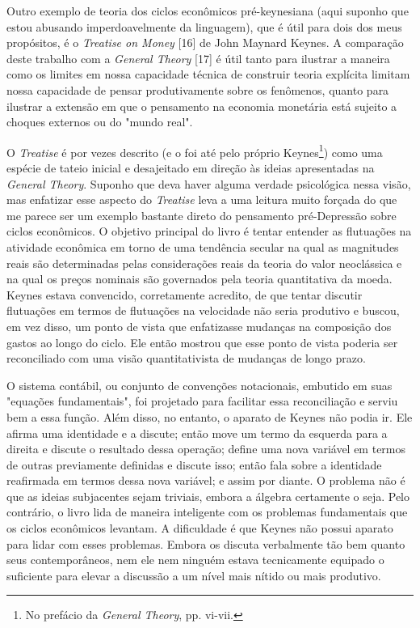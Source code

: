 \documentclass[12pt]{article}
\begin{document}
Outro exemplo de teoria dos ciclos econômicos pré-keynesiana (aqui suponho que estou abusando imperdoavelmente da linguagem), que é útil para dois dos meus propósitos, é o \textit{Treatise on Money} [16] de John Maynard Keynes. A comparação deste trabalho com a \textit{General Theory} [17] é útil tanto para ilustrar a maneira como os limites em nossa capacidade técnica de construir teoria explícita limitam nossa capacidade de pensar produtivamente sobre os fenômenos, quanto para ilustrar a extensão em que o pensamento na economia monetária está sujeito a choques externos ou do "mundo real".

O \textit{Treatise} é por vezes descrito (e o foi até pelo próprio Keynes\footnote{No prefácio da \textit{General Theory}, pp. vi-vii.}) como uma espécie de tateio inicial e desajeitado em direção às ideias apresentadas na \textit{General Theory}. Suponho que deva haver alguma verdade psicológica nessa visão, mas enfatizar esse aspecto do \textit{Treatise} leva a uma leitura muito forçada do que me parece ser um exemplo bastante direto do pensamento pré-Depressão sobre ciclos econômicos. O objetivo principal do livro é tentar entender as flutuações na atividade econômica em torno de uma tendência secular na qual as magnitudes reais são determinadas pelas considerações reais da teoria do valor neoclássica e na qual os preços nominais são governados pela teoria quantitativa da moeda. Keynes estava convencido, corretamente acredito, de que tentar discutir flutuações em termos de flutuações na velocidade não seria produtivo e buscou, em vez disso, um ponto de vista que enfatizasse mudanças na composição dos gastos ao longo do ciclo. Ele então mostrou que esse ponto de vista poderia ser reconciliado com uma visão quantitativista de mudanças de longo prazo.

O sistema contábil, ou conjunto de convenções notacionais, embutido em suas "equações fundamentais", foi projetado para facilitar essa reconciliação e serviu bem a essa função. Além disso, no entanto, o aparato de Keynes não podia ir. Ele afirma uma identidade e a discute; então move um termo da esquerda para a direita e discute o resultado dessa operação; define uma nova variável em termos de outras previamente definidas e discute isso; então fala sobre a identidade reafirmada em termos dessa nova variável; e assim por diante. O problema não é que as ideias subjacentes sejam triviais, embora a álgebra certamente o seja. Pelo contrário, o livro lida de maneira inteligente com os problemas fundamentais que os ciclos econômicos levantam. A dificuldade é que Keynes não possui aparato para lidar com esses problemas. Embora os discuta verbalmente tão bem quanto seus contemporâneos, nem ele nem ninguém estava tecnicamente equipado o suficiente para elevar a discussão a um nível mais nítido ou mais produtivo.
\end{document}
